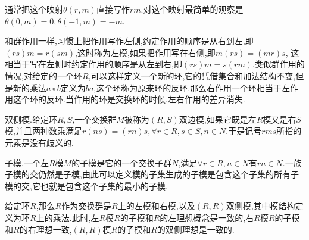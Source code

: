 通常把这个映射$\theta(r,m)$直接写作$rm$.对这个映射最简单的观察是$\theta(0,m)=0,\theta(-1,m)=-m$.

和群作用一样,习惯上把作用写作左侧,约定作用的顺序是从右到左,即$(rs)m=r(sm)$,这时称为左模,如果把作用写在右侧,即$m(rs)=(mr)s$, 这相当于写在左侧时约定作用的顺序是从左到右,即$(rs)m=s(rm)$.类似群作用的情况,对给定的一个环$R$,可以这样定义一个新的环,它的凭借集合和加法结构不变,但是新的乘法$a\circ b$定义为$ba$,这个环称为原来环的反环.那么右作用一个环相当于左作用这个环的反环.当作用的环是交换环的时候,左右作用的差异消失.

双侧模.给定环$R,S$,一个交换群$M$被称为$(R,S)$双边模,如果它既是左$R$模又是右$S$模,并且两种数乘满足$r(ns)=(rn)s,\forall r\in R,s\in S,n\in N$.于是记号$rms$所指的元素是没有歧义的.

子模.一个左$R$模$M$的子模是它的一个交换子群$N$,满足$\forall r\in R,n\in N$有$rn\in N$.一族子模的交仍然是子模,由此可以定义模的子集生成的子模是包含这个子集的所有子模的交,它也就是包含这个子集的最小的子模.

给定环$R$,那么$R$作为交换群是$R$上的左模和右模,以及$(R,R)$双侧模,其中模结构定义为环$R$上的乘法.此时,左$R$模$R$的子模和$R$的左理想概念是一致的,右$R$模$R$的子模和$R$的右理想一致,$(R,R)$模$R$的子模和$R$的双侧理想是一致的.

